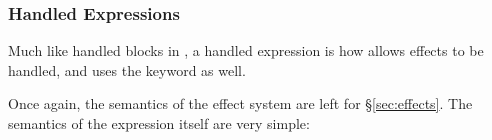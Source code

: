 \subsubsection{Handled Expressions}

Much like handled blocks in \Prose{}, a handled expression is how \Poetry{}
allows effects to be handled, and uses the  keyword as well.

\begin{bnf*}
\end{bnf*}

Once again, the semantics of the effect system are left for \S\ref{sec:effects}.
The semantics of the  expression itself are very simple:

\begin{prooftree}
\end{prooftree}
